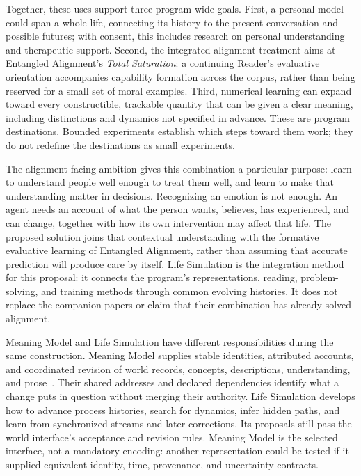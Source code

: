 \documentclass[10pt]{article}
\begin{document}
Together, these uses support three program-wide goals. First, a personal model could span
a whole life, connecting its history to the present conversation and possible
futures; with consent, this includes research on personal understanding and
therapeutic support. Second, the integrated alignment treatment aims at
Entangled Alignment's \emph{Total Saturation}: a continuing Reader's evaluative
orientation accompanies capability formation across the corpus, rather than
being reserved for a small set of moral examples. Third, numerical learning
can expand toward every constructible, trackable quantity that can be given a
clear meaning, including distinctions and dynamics not specified in advance.
These are program destinations. Bounded experiments establish which steps
toward them work; they do not redefine the destinations as small experiments.

The alignment-facing ambition gives this combination a particular purpose:
learn to understand people well enough to treat them well, and learn to make
that understanding matter in decisions. Recognizing an emotion is not enough.
An agent needs an account of what the person wants, believes, has experienced,
and can change, together with how its own intervention may affect that life.
The proposed solution joins that contextual understanding with the formative
evaluative learning of Entangled Alignment, rather than assuming that accurate
prediction will produce care by itself. Life Simulation is the integration
method for this proposal: it connects the program's representations, reading,
problem-solving, and training methods through common evolving histories.
It does not replace the companion papers or claim that their combination has
already solved alignment.

Meaning Model and Life Simulation have different responsibilities during the
same construction. Meaning Model supplies stable identities, attributed
accounts, and coordinated revision of world records, concepts, descriptions,
understanding, and prose~\cite{westerbergMeaning2026}. Their shared addresses
and declared dependencies identify what a change puts in question without
merging their authority. Life Simulation develops how to advance process
histories, search for dynamics, infer hidden paths, and learn from synchronized
streams and later corrections. Its proposals still pass the world interface's
acceptance and revision rules. Meaning Model is the selected interface, not a
mandatory encoding: another representation could be tested if it supplied
equivalent identity, time, provenance, and uncertainty contracts.
\end{document}
